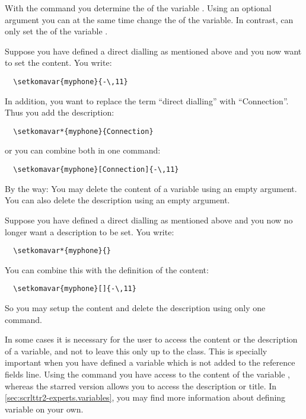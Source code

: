 \begin{Declaration}
\end{Declaration}
With the command  you determine the
 of the variable . Using an optional
argument you can at the same time  change  the 
of the variable. In contrast,  can only set the
 of the variable .
\begin{Example}
  Suppose you have defined a direct dialling as mentioned above
  and you now want to set the content. You write:
\begin{lstlisting}
  \setkomavar{myphone}{-\,11}
\end{lstlisting}
  In addition, you want to replace the term ``direct dialling''
  with ``Connection''. Thus you add the description:
\begin{lstlisting}
  \setkomavar*{myphone}{Connection}
\end{lstlisting}
  or you can combine both in one command:
\begin{lstlisting}
  \setkomavar{myphone}[Connection]{-\,11}
\end{lstlisting}
\end{Example}
By the way: You may delete the content of a variable using an empty
 argument. You can also delete the description using an
empty  argument.
\begin{Example}
  Suppose you have defined a direct dialling as mentioned above and
  you now no longer want a description to be set. You write:
\begin{lstlisting}
  \setkomavar*{myphone}{}
\end{lstlisting}
  You can combine this with the definition of the content:
\begin{lstlisting}
  \setkomavar{myphone}[]{-\,11}
\end{lstlisting}
  So you may setup the content and delete the description using only
  one command.
\end{Example}
%
\EndIndexGroup


\begin{Declaration}
\end{Declaration}
In some cases it is necessary for the user
to access the content or the description of a variable, and not to leave this
only up to the class. This is specially important when you have defined a
variable which is not added to the reference fields line. Using the command
 you have access to the content of the variable
, whereas the starred version  allows you to
access the description or title. In \autoref{sec:scrlttr2-experts.variables},
 you may find more
information about defining variable on your own.%
\EndIndexGroup


